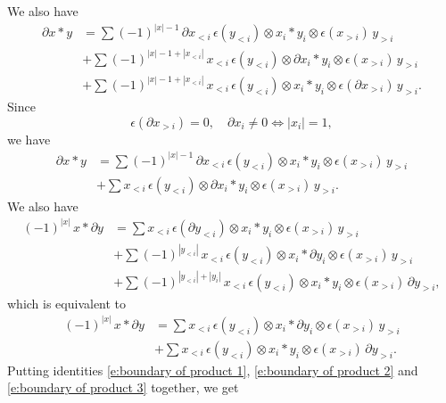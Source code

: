 We also have
\begin{align*}
\partial x \ast y & = 
\sum (-1)^{|x|-1} \, \partial x_{<i}\, \epsilon(y_{<i}) \otimes x_i \ast y_i \otimes \epsilon(x_{>i}) \, y_{>i} \\ & +
\sum (-1)^{|x|-1+|x_{<i}|} \, x_{<i}\, \epsilon(y_{<i}) \otimes \partial x_i \ast y_i \otimes \epsilon(x_{>i}) \, y_{>i} \\ & +
\sum (-1)^{|x|-1+|x_{<i}|} \, x_{<i}\, \epsilon(y_{<i}) \otimes x_i \ast y_i \otimes \epsilon(\partial x_{>i}) \, y_{>i}.
\end{align*}
Since
\begin{equation*}
\epsilon(\partial x_{>i}) = 0, \quad \partial x_i \neq 0 \Leftrightarrow |x_i| = 1,
\end{equation*}
we have
\begin{equation} \label{e:boundary of product 2}
\begin{split}
\partial x \ast y & = 
\sum (-1)^{|x|-1} \, \partial x_{<i}\, \epsilon(y_{<i}) \otimes x_i \ast y_i \otimes \epsilon(x_{>i})\, y_{>i} \\ & +
\sum x_{<i}\, \epsilon(y_{<i}) \otimes \partial x_i \ast y_i \otimes \epsilon(x_{>i})\, y_{>i}.
\end{split}
\end{equation}
We also have
\begin{align*}
(-1)^{|x|} \, x \ast \partial y & = 
\sum x_{<i} \, \epsilon(\partial y_{<i}) \otimes x_i \ast y_i \otimes \epsilon(x_{>i})\, y_{>i} \\ & +
\sum (-1)^{|y_{<i}|} \, x_{<i}\, \epsilon(y_{<i}) \otimes x_i \ast \partial y_i \otimes \epsilon(x_{>i}) \, y_{>i} \\ & +
\sum (-1)^{|y_{<i}| + |y_i|} \, x_{<i}\, \epsilon(y_{<i}) \otimes x_i \ast y_i \otimes \epsilon(x_{>i}) \, \partial y_{>i},
\end{align*}
which is equivalent to
\begin{equation} \label{e:boundary of product 3}
\begin{split}
(-1)^{|x|} \, x \ast \partial y & = 
\sum x_{<i} \, \epsilon(y_{<i}) \otimes x_i \ast \partial y_i \otimes \epsilon(x_{>i})\, y_{>i} \\ & +
\sum x_{<i}\, \epsilon(y_{<i}) \otimes x_i \ast y_i \otimes \epsilon(x_{>i})\, \partial y_{>i}.
\end{split}
\end{equation}
Putting identities \eqref{e:boundary of product 1}, \eqref{e:boundary of product 2} and \eqref{e:boundary of product 3} together, we get

